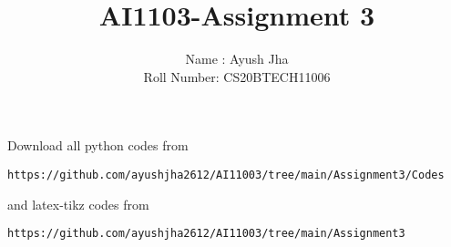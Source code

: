 \documentclass[journal,12pt,twocolumn]{IEEEtran}
\DeclareMathOperator*{\Res}{Res}
\begin{document}
\newcommand{\BEQA}{\begin{eqnarray}}
\newcommand{\EEQA}{\end{eqnarray}}
\newcommand{\define}{\stackrel{\triangle}{=}}

\raggedbottom
\setlength{\parindent}{0pt}
\providecommand{\mbf}{\mathbf}
\providecommand{\pr}[1]{\ensuremath{\Pr\left(#1\right)}}
\providecommand{\qfunc}[1]{\ensuremath{Q\left(#1\right)}}
\providecommand{\sbrak}[1]{\ensuremath{{}\left[#1\right]}}
\providecommand{\lsbrak}[1]{\ensuremath{{}\left[#1\right.}}
\providecommand{\rsbrak}[1]{\ensuremath{{}\left.#1\right]}}
\providecommand{\brak}[1]{\ensuremath{\left(#1\right)}}
\providecommand{\lbrak}[1]{\ensuremath{\left(#1\right.}}
\providecommand{\rbrak}[1]{\ensuremath{\left.#1\right)}}
\providecommand{\cbrak}[1]{\ensuremath{\left\{#1\right\}}}
\providecommand{\lcbrak}[1]{\ensuremath{\left\{#1\right.}}
\providecommand{\rcbrak}[1]{\ensuremath{\left.#1\right\}}}
\theoremstyle{remark}
\newtheorem{rem}{Remark}
\newcommand{\sgn}{\mathop{\mathrm{sgn}}}
\providecommand{\abs}[1]{\vert#1\vert}
\providecommand{\res}[1]{\Res\displaylimits_{#1}} 
\providecommand{\norm}[1]{\lVert#1\rVert}
\providecommand{\mtx}[1]{\mathbf{#1}}
\providecommand{\mean}[1]{E[ #1 ]}
\providecommand{\fourier}{\overset{\mathcal{F}}{ \rightleftharpoons}}
\providecommand{\system}{\overset{\mathcal{H}}{ \longleftrightarrow}}
\newcommand{\solution}{\noindent \textbf{Solution: }}
\newcommand{\cosec}{\,\text{cosec}\,}
\providecommand{\dec}[2]{\ensuremath{\overset{#1}{\underset{#2}{\gtrless}}}}
\newcommand{\myvec}[1]{\ensuremath{\begin{pmatrix}#1\end{pmatrix}}}
\newcommand{\mydet}[1]{\ensuremath{\begin{vmatrix}#1\end{vmatrix}}}
\makeatletter
{}
\makeatother
\let\StandardTheFigure\thefigure
\let\vec\mathbf
\renewcommand{\thefigure}{\theproblem}
\def\putbox#1#2#3{\makebox[0in][l]{\makebox[#1][l]{}\raisebox{\baselineskip}[0in][0in]{\raisebox{#2}[0in][0in]{#3}}}}
     \def\rightbox#1{\makebox[0in][r]{#1}}
     \def\centbox#1{\makebox[0in]{#1}}
     \def\topbox#1{\raisebox{-\baselineskip}[0in][0in]{#1}}
     \def\midbox#1{\raisebox{-0.5\baselineskip}[0in][0in]{#1}}
\vspace{3cm}
\title{AI1103-Assignment 3}
\author{Name : Ayush Jha \\ Roll Number: CS20BTECH11006}
\maketitle
\newpage
\bigskip
\renewcommand{\thefigure}{\theenumi}
\renewcommand{\thetable}{\theenumi}
Download all python codes from 
\begin{lstlisting}
https://github.com/ayushjha2612/AI11003/tree/main/Assignment3/Codes
\end{lstlisting}
%
and latex-tikz codes from 
%
\begin{lstlisting}
https://github.com/ayushjha2612/AI11003/tree/main/Assignment3
\end{lstlisting}
\end{document}
